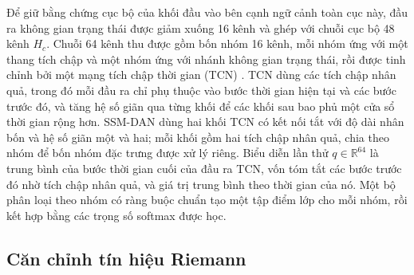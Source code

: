 \documentclass[preprint,12pt]{elsarticle}
\begin{document}
Để giữ bằng chứng cục bộ của khối đầu vào bên cạnh ngữ cảnh toàn cục này, đầu ra không gian trạng thái được giảm xuống 16 kênh và ghép với chuỗi cục bộ 48 kênh $H_c$. Chuỗi 64 kênh thu được gồm bốn nhóm 16 kênh, mỗi nhóm ứng với một thang tích chập và một nhóm ứng với nhánh không gian trạng thái, rồi được tinh chỉnh bởi một mạng tích chập thời gian (TCN) \cite{altaheri2023atcnet}. TCN dùng các tích chập nhân quả, trong đó mỗi đầu ra chỉ phụ thuộc vào bước thời gian hiện tại và các bước trước đó, và tăng hệ số giãn qua từng khối để các khối sau bao phủ một cửa sổ thời gian rộng hơn. SSM-DAN dùng hai khối TCN có kết nối tắt với độ dài nhân bốn và hệ số giãn một và hai; mỗi khối gồm hai tích chập nhân quả, chia theo nhóm để bốn nhóm đặc trưng được xử lý riêng. Biểu diễn lần thử $q\in\mathbb{R}^{64}$ là trung bình của bước thời gian cuối của đầu ra TCN, vốn tóm tắt các bước trước đó nhờ tích chập nhân quả, và giá trị trung bình theo thời gian của nó. Một bộ phân loại theo nhóm có ràng buộc chuẩn tạo một tập điểm lớp cho mỗi nhóm, rồi kết hợp bằng các trọng số softmax được học.

\subsection{Căn chỉnh tín hiệu Riemann}
\label{subsec:ra}
\end{document}
